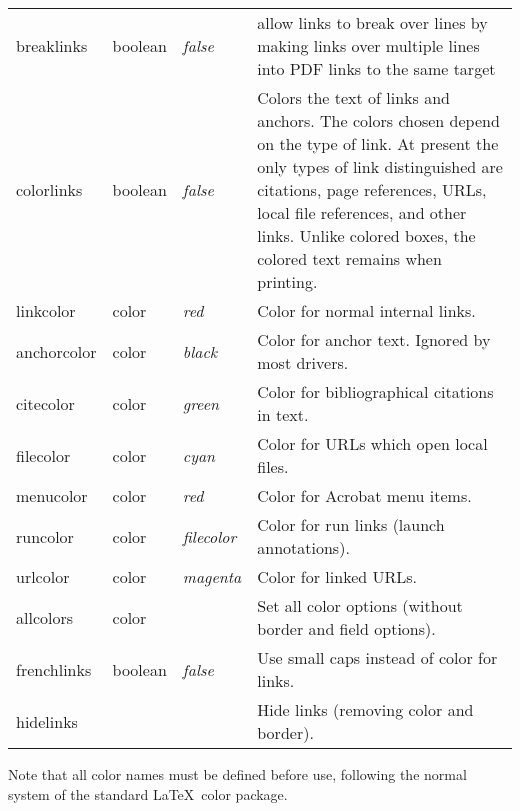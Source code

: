 \documentclass{article}
\newcommand*{\xpackage}[1]{\textsf{#1}}
\begin{document}
\begin{longtable}{@{}>{\ttfamily}ll>{\itshape}lp{8cm}@{}}
breaklinks     & boolean & false   & allow links to break over lines by making links over multiple lines into PDF links to
                                     the same target \\
colorlinks     & boolean & false   & Colors the text of links and anchors. The colors chosen depend on the type of
                                     link. At present the only types of link distinguished are citations, page references,
                                     URLs, local file references, and other links.
                                     Unlike colored boxes, the colored
                                     text remains when printing.\\
linkcolor      & color   & red     & Color for normal internal links. \\
anchorcolor    & color   & black   & Color for anchor text. Ignored by most drivers. \\
citecolor      & color   & green   & Color for bibliographical citations in text. \\
filecolor      & color   & cyan    & Color for URLs which open local files. \\
menucolor      & color   & red     & Color for Acrobat menu items. \\
runcolor       & color   & filecolor & Color for run links (launch annotations). \\
urlcolor       & color   & magenta & Color for linked URLs. \\
allcolors      & color   &         & Set all color options (without border and field options).\\
frenchlinks    & boolean & false   & Use small caps instead of color for links.\\
hidelinks      &         &         & Hide links (removing color and border). \\
\end{longtable} \smallskip

Note that all color names must be defined before use, following the
normal system of the standard \LaTeX\ \xpackage{color} package.
\end{document}
